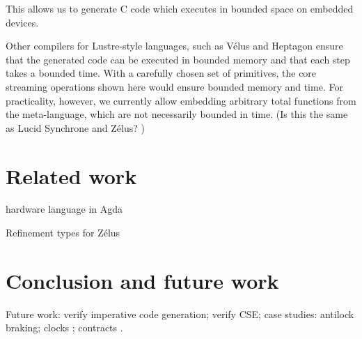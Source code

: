 \documentclass[sigplan,screen]{acmart}
\begin{document}
This allows us to generate C code which executes in bounded space on embedded devices.

Other compilers for Lustre-style languages, such as Vélus\cite{bourke2017formally} and Heptagon \cite{gerard2012modular} ensure that the generated code can be executed in bounded memory and that each step takes a bounded time.
With a carefully chosen set of primitives, the core streaming operations shown here would ensure bounded memory and time.
For practicality, however, we currently allow embedding arbitrary total functions from the \fstar{} meta-language, which are not necessarily bounded in time.
(Is this the same as Lucid Synchrone and Zélus? \CITE)

\section{Related work}

hardware language in Agda \cite{harrison2021mechanized}

Refinement types for Zélus \cite{chen2022synchronous}

\section{Conclusion and future work}

Future work: verify imperative code generation; verify CSE; case studies: antilock braking; clocks \cite{caspi1995functional}; contracts \cite{champion2016kind2}.

\pagebreak





\end{document}
